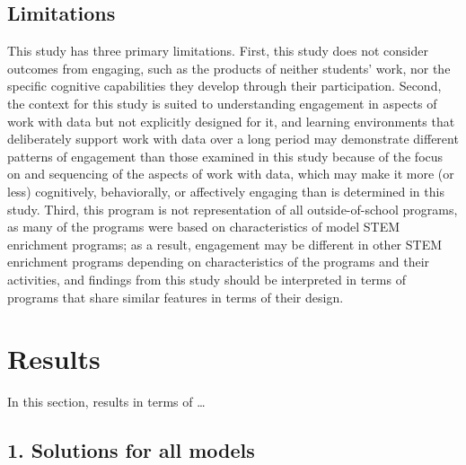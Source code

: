 \documentclass[]{book}
\theoremstyle{definition}
\theoremstyle{definition}
\theoremstyle{definition}
\theoremstyle{remark}
\begin{document}
\section{Limitations}\label{limitations}

This study has three primary limitations. First, this study does not
consider outcomes from engaging, such as the products of neither
students' work, nor the specific cognitive capabilities they develop
through their participation. Second, the context for this study is
suited to understanding engagement in aspects of work with data but not
explicitly designed for it, and learning environments that deliberately
support work with data over a long period may demonstrate different
patterns of engagement than those examined in this study because of the
focus on and sequencing of the aspects of work with data, which may make
it more (or less) cognitively, behaviorally, or affectively engaging
than is determined in this study. Third, this program is not
representation of all outside-of-school programs, as many of the
programs were based on characteristics of model STEM enrichment
programs; as a result, engagement may be different in other STEM
enrichment programs depending on characteristics of the programs and
their activities, and findings from this study should be interpreted in
terms of programs that share similar features in terms of their design.

\chapter{Results}\label{results}

In this section, results in terms of \ldots{}

\section{1. Solutions for all models}\label{solutions-for-all-models}
\end{document}
